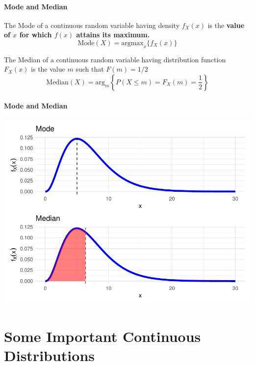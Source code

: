 \documentclass[notes=show,smaller]{beamer}\usepackage[]{graphicx}\usepackage[]{color}
\newenvironment{knitrout}{}{} %
\begin{document}
\begin{frame}{\secname}
\framesubtitle{Mode and Median}
  \begin{definition}[Mode]
    The Mode of a continuous random variable having
    density $f_{X}(x)$ is the \textbf{value of $x$ for which $f(x)$ attains its maximum.}
    $$\text{Mode}(X) = \text{argmax}_{x}\{f_X(x)\}$$
  \end{definition}

  \begin{definition}[Median]
  The Median of a continuous random variable having
  distribution function $F_{X}(x)$ is the value $m$ such that $F(m) = 1/2$
  $$\text{Median}(X) = \text{arg}_{m}\left\{P(X\leq m) = F_X(m) = \frac{1}{2}\right\}$$
  \end{definition}
\end{frame}

\begin{frame}{\secname}
\framesubtitle{Mode and Median}
\begin{knitrout}
\color{fgcolor}

{\centering \includegraphics[width=0.8\linewidth]{figure/unnamed-chunk-8-1} 

}



\end{knitrout}
\end{frame}

\section{Some Important Continuous Distributions}
\end{document}
